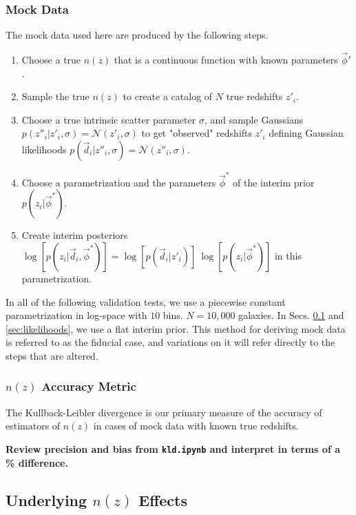 \documentclass[iop]{emulateapj}
\begin{document}
\subsubsection{Mock Data}
\label{sec:mockdata}

The mock data used here are produced by the following steps.

\begin{enumerate}
	\item \label{itm:true} Choose a true $n(z)$ that is a continuous 
function with known parameters $\vec{\phi}'$.
	\item \label{itm:sample} Sample the true $n(z)$ to create a catalog of 
$N$ true redshifts $z'_{i}$.
	\item \label{itm:scatter} Choose a true intrinsic scatter parameter 
$\sigma$, and sample Gaussians $p(z''_{i} | z'_{i}, \sigma) = 
\mathcal{N}(z'_{i}, \sigma)$ to get "observed" redshifts $z'_{i}$ defining 
Gaussian likelihoods $p(\vec{d}_{i} | z''_{i}, \sigma) = \mathcal{N}(z''_{i}, 
\sigma)$.
	\item \label{itm:interim} Choose a parametrization and the parameters 
$\vec{\phi}^{*}$ of the interim prior $p(z_{i} | \vec{\phi}^{*})$.
	\item \label{itm:posterior} Create interim posteriors $\log[p(z_{i} | 
\vec{d}_{i}, \vec{\phi}^{*})] = \log[p(\vec{d}_{i} | z'_{i})]\ \log[p(z_{i} | 
\vec{\phi}^{*})]$ in this parametrization.
\end{enumerate}

In all of the following validation tests, we use a piecewise constant 
parametrization in log-space with $10$ bins.  $N = 10,000$ galaxies.  In Secs. 
\ref{sec:truth} and \ref{sec:likelihoods}, we use a flat interim prior.  This 
method for deriving mock data is referred to as the fiducial case, and 
variations on it will refer directly to the steps that are altered.

\subsubsection{$n(z)$ Accuracy Metric}
\label{sec:accuracy}

The Kullback-Leibler divergence is our primary measure of the accuracy of 
estimators of $n(z)$ in cases of mock data with known true redshifts.

\textbf{Review precision and bias from \texttt{kld.ipynb} and interpret in 
terms of a \% difference.}

\subsection{Underlying $n(z)$ Effects}
\label{sec:truth}
\end{document}
